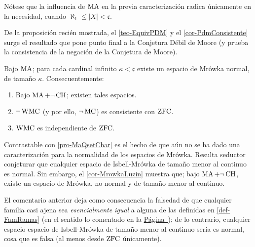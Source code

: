 Nótese que la influencia de $\operatorname{MA}$ en la previa caracterización radica únicamente en la necesidad, cuando $\aleph_1 \leq |X| < \mathfrak{c}$.

De la proposición recién mostrada, el \autoref{teo-EquivPDM} y el \autoref{cor-PdmConsistente} surge el resultado que pone punto final a la Conjetura Débil de Moore (y prueba la consistencia de la negación de la Conjetura de Moore).

\begin{corolario}\label{cor-PdmIndependiente}
	Bajo $\operatorname{MA}$; para cada cardinal infinito $\kappa<\mathfrak{c}$ existe un espacio de Mrówka normal, de tamaño $\kappa$. Consecuentemente:
	\begin{enumerate}
		\item Bajo $\operatorname{MA}+\lnot \operatorname{CH}$; existen tales espacios.
		\item $\lnot\operatorname{WMC}$ (y por ello, $\lnot\operatorname{MC}$) es consistente con $\operatorname{ZFC}$.
		\item $\operatorname{WMC}$ es independiente de $\operatorname{ZFC}$.
	\end{enumerate}
\end{corolario}

Contrastable con \ref{pro-MaQsetChar} es el hecho de que aún no se ha dado una caracterización para la normalidad de los espacios de Mrówka. Resulta seductor conjeturar que cualquier espacio de Isbell-Mrówka de tamaño menor al continuo es normal. Sin embargo, el \autoref{cor-MrowkaLuzin} muestra que; bajo $\operatorname{MA}+\lnot \operatorname{CH}$, existe un espacio de Mrówka, no normal y de tamaño menor al continuo.

El comentario anterior deja como consecuencia la falsedad de que cualquier familia casi ajena sea \textit{esencialmente igual} a alguna de las definidas en \ref{def-FamRamas} (en el sentido lo comentado en la \hyperref[Dif-esencial]{Página~\pageref{Dif-esencial}}); de lo contrario, cualquier espacio espacio de Isbell-Mrówka de tamaño menor al continuo sería es normal, cosa que es falsa (al menos desde $\operatorname{ZFC}$ únicamente).

